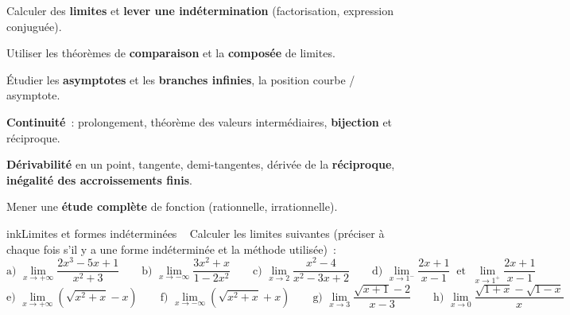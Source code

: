 \def\piedfiche{TD n°1 · Terminale S2}



\begin{competences}
  \item Calculer des \textbf{limites} et \textbf{lever une indétermination} (factorisation, expression conjuguée).
  \item Utiliser les théorèmes de \textbf{comparaison} et la \textbf{composée} de limites.
  \item Étudier les \textbf{asymptotes} et les \textbf{branches infinies}, la position courbe / asymptote.
  \item \textbf{Continuité}~: prolongement, théorème des valeurs intermédiaires, \textbf{bijection} et réciproque.
  \item \textbf{Dérivabilité} en un point, tangente, demi-tangentes, dérivée de la \textbf{réciproque}, \textbf{inégalité des accroissements finis}.
  \item Mener une \textbf{étude complète} de fonction (rationnelle, irrationnelle).
\end{competences}


\begin{exo}{ink}{Limites et formes indéterminées \ }
Calculer les limites suivantes (préciser à chaque fois s'il y a une forme indéterminée et la méthode utilisée)~:
\[
\text{a) } \lim_{x\to+\infty}\frac{2x^3-5x+1}{x^2+3} \qquad
\text{b) } \lim_{x\to-\infty}\frac{3x^2+x}{1-2x^2} \qquad
\text{c) } \lim_{x\to2}\frac{x^2-4}{x^2-3x+2} \qquad
\text{d) } \lim_{x\to1^{-}}\frac{2x+1}{x-1}\ \text{ et }\ \lim_{x\to1^{+}}\frac{2x+1}{x-1}
\]
\[
\text{e) } \lim_{x\to+\infty}\left(\sqrt{x^2+x}-x\right) \qquad
\text{f) } \lim_{x\to-\infty}\left(\sqrt{x^2+x}+x\right) \qquad
\text{g) } \lim_{x\to3}\frac{\sqrt{x+1}-2}{x-3} \qquad
\text{h) } \lim_{x\to0}\frac{\sqrt{1+x}-\sqrt{1-x}}{x}
\]
\end{exo}

